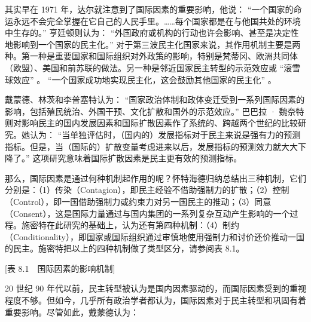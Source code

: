其实早在 1971 年，达尔就注意到了国际因素的重要影响，他说： “一个国家的命运永远不会完全掌握在它自己的人民手里。……每个国家都是在与他国共处的环境中生存的。” 亨廷顿则认为： “外国政府或机构的行动也许会影响、甚至是决定性地影响到一个国家的民主化。” 对于第三波民主化国家来说，其作用机制主要是两种。第一种是重要国家和国际组织对外政策的影响，特别是梵蒂冈、欧洲共同体（欧盟）、美国和前苏联的做法。另一种是邻近国家民主转型的示范效应或 “滚雪球效应” 。 “一个国家成功地实现民主化，这会鼓励其他国家的民主化” 。

戴蒙德、林茨和李普塞特认为： “国家政治体制和政体变迁受到一系列国际因素的影响，包括殖民统治、外国干预、文化扩散和国外的示范效应。” 巴巴拉 · 魏奈特则对影响民主的国内发展因素和国际扩散因素作了系统的、跨越两个世纪的比较研究。她认为： “当单独评估时，（国内的）发展指标对于民主来说是强有力的预测指标。但是，当（国际的）扩散变量考虑进来以后，发展指标的预测效力就大大下降了。” 这项研究意味着国际扩散因素是民主更有效的预测指标。

那么，国际因素是通过何种机制起作用的呢？怀特海德归纳总结出三种机制，它们分别是：（1）传染（Contagion），即民主经验不借助强制力的扩散；（2）控制（Control），即一国借助强制力或约束力对另一国民主的推动；（3）同意（Consent），这是国际力量通过与国内集团的一系列复杂互动产生影响的一个过程。施密特在此研究的基础上，认为还有第四种机制：（4）制约（Conditionality），即国家或国际组织通过审慎地使用强制力和讨价还价推动一国的民主。施密特把以上的四种机制做了类型区分，请参阅表 8.1。

[表 8.1　国际因素的影响机制]

20 世纪 90 年代以前，民主转型被认为是国内因素驱动的，而国际因素受到的重视程度不够。但如今，几乎所有政治学者都认为，国际因素对于民主转型和巩固有着重要影响。尽管如此，戴蒙德认为：

